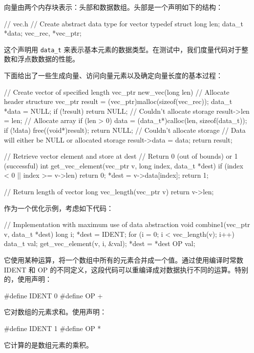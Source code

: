 向量由两个内存块表示：头部和数据数组。头部是一个声明如下的结构：

\begin{cppcode}
// vec.h
// Create abstract data type for vector
typedef struct {
  long len;
  data_t *data;
} vec_rec, *vec_ptr;
\end{cppcode}

这个声明用 \verb|data_t| 来表示基本元素的数据类型。在测试中，我们度量代码对于整数和浮点数数据的性能。

下面给出了一些生成向量、访问向量元素以及确定向量长度的基本过程：

\begin{cppcode}
// Create vector of specified length
vec_ptr new_vec(long len) {
  // Allocate header structure
  vec_ptr result = (vec_ptr)malloc(sizeof(vec_rec));
  data_t *data = NULL;
  if (!result) return NULL; // Couldn't allocate storage
  result->len = len;
  // Allocate array
  if (len > 0) {
    data = (data_t*)calloc(len, sizeof(data_t));
    if (!data) {
      free((void*)result);
      return NULL; // Couldn't allocate storage
    }
  }
  // Data will either be NULL or allocated storage
  result->data = data;
  return result;
}

// Retrieve vector element and store at dest
// Return 0 (out of bounds) or 1 (successful)
int get_vec_element(vec_ptr v, long index, data_t *dest) {
  if (index < 0 || index >= v->len) return 0;
  *dest = v->data[index];
  return 1;
}

// Return length of vector
long vec_length(vec_ptr v) {
  return v->len;
}
\end{cppcode}

作为一个优化示例，考虑如下代码：

\begin{cppcode}
// Implementation with maximum use of data abstraction
void combine1(vec_ptr v, data_t *dest) {
  long i;
  *dest = IDENT;
  for (i = 0; i < vec_length(v); i++) {
    data_t val;
    get_vec_element(v, i, &val);
    *dest = *dest OP val;
  }
}
\end{cppcode}

它使用某种运算，将一个数组中所有的元素合并成一个值。通过使用编译时常数 IDENT 和 OP 的不同定义，这段代码可以重编译成对数据执行不同的运算。特别的，使用声明：
\begin{cppcode}
#define IDENT 0
#define OP +
\end{cppcode}
它对数组的元素求和。使用声明：
\begin{cppcode}
#define IDENT 1
#define OP *
\end{cppcode}
它计算的是数组元素的乘积。

